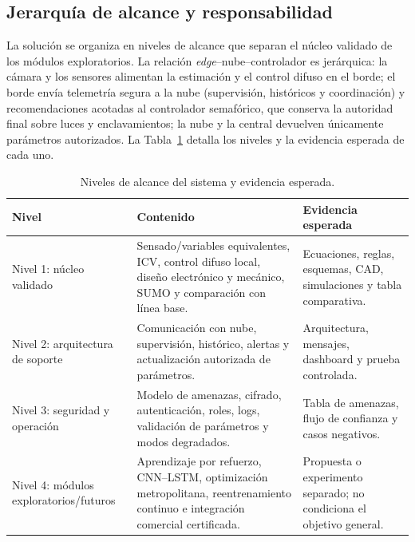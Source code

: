 \subsection{Jerarquía de alcance y responsabilidad}\label{sec:jerarquia-alcance}

La solución se organiza en niveles de alcance que separan el núcleo validado de los módulos exploratorios. La
relación \emph{edge}--nube--controlador es jerárquica: la cámara y los sensores alimentan la estimación y el
control difuso en el borde; el borde envía telemetría segura a la nube (supervisión, históricos y coordinación)
y recomendaciones acotadas al controlador semafórico, que conserva la autoridad final sobre luces y
enclavamientos; la nube y la central devuelven únicamente parámetros autorizados. La
Tabla~\ref{tab:niveles-alcance} detalla los niveles y la evidencia esperada de cada uno.

\begin{table}[H]
  \centering
  \footnotesize
  \caption{Niveles de alcance del sistema y evidencia esperada.}
  \label{tab:niveles-alcance}
  \begin{tabularx}{\linewidth}{@{}>{\raggedright\arraybackslash}p{3.5cm}>{\raggedright\arraybackslash}X>{\raggedright\arraybackslash}p{4.6cm}@{}}
    \toprule
    \textbf{Nivel} & \textbf{Contenido} & \textbf{Evidencia esperada}\\
    \midrule
    Nivel 1: núcleo validado & Sensado/variables equivalentes, ICV, control difuso local, diseño electrónico y mecánico, SUMO y comparación con línea base. & Ecuaciones, reglas, esquemas, CAD, simulaciones y tabla comparativa.\\
    Nivel 2: arquitectura de soporte & Comunicación con nube, supervisión, histórico, alertas y actualización autorizada de parámetros. & Arquitectura, mensajes, dashboard y prueba controlada.\\
    Nivel 3: seguridad y operación & Modelo de amenazas, cifrado, autenticación, roles, logs, validación de parámetros y modos degradados. & Tabla de amenazas, flujo de confianza y casos negativos.\\
    Nivel 4: módulos exploratorios/futuros & Aprendizaje por refuerzo, CNN--LSTM, optimización metropolitana, reentrenamiento continuo e integración comercial certificada. & Propuesta o experimento separado; no condiciona el objetivo general.\\
    \bottomrule
  \end{tabularx}
\end{table}

